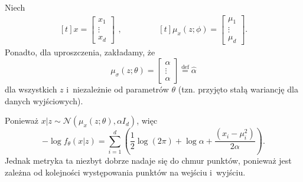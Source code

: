 \documentclass{iithesis}
\begin{document}
Niech
\begin{equation*}
\begin{aligned}[t]
x =
\begin{bmatrix}
x_1 \\
\vdots \\
x_d
\end{bmatrix}
\end{aligned}
,\qquad \qquad
\begin{aligned}[t]
\mu_x(z;\phi) =
\begin{bmatrix}
\mu_1 \\
\vdots \\
\mu_d
\end{bmatrix}
.
\end{aligned}
\end{equation*}
Ponadto, dla uproszczenia, zakładamy, że
\begin{equation*}
\mu_\sigma(z;\theta) =
\begin{bmatrix}
\alpha \\
\vdots \\
\alpha
\end{bmatrix}
\overset{\mathrm{def}}{=} \hat{\alpha}
\end{equation*}
dla wszystkich $z$ i~niezależnie od parametrów $\theta$ (tzn. przyjęto stałą wariancję dla danych wyjściowych).

Ponieważ $x|z \sim \mathcal{N}(\mu_x(z;\theta), \alpha I_d)$, więc
\begin{equation} \label{eq:log_density}
-\log f_\theta(x|z)=\sum_{i=1}^d \left( \frac{1}{2}\log(2\pi) + \log \alpha
+\frac{(x_i-\mu_i^2)}{2\alpha} \right).
\end{equation}
Jednak metryka ta niezbyt dobrze nadaje się do chmur punktów,
ponieważ jest zależna od kolejności występowania punktów na wejściu i~wyjściu.
\end{document}
